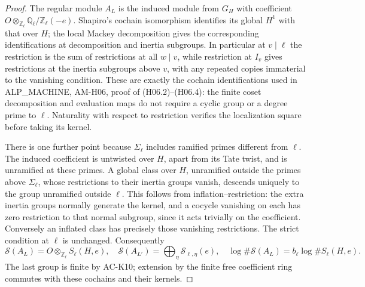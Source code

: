 \begin{proof}
The regular module $A_L$ is the induced module from
$G_H$ with coefficient
$O\otimes_{\mathbb Z_\ell}\mathbb Q_\ell/\mathbb Z_\ell(-e)$.
Shapiro's cochain isomorphism identifies its global
$H^1$ with that over $H$; the local Mackey decomposition
gives the corresponding identifications at decomposition
and inertia subgroups.  In particular at $v\mid\ell$
the restriction is the sum of restrictions at all
$w\mid v$, while restriction at $I_v$ gives restrictions
at the inertia subgroups above $v$, with any repeated
copies immaterial to the vanishing condition.
These are exactly the cochain identifications used in
ALP\_MACHINE, AM-H06, proof of (H06.2)--(H06.4):
the finite coset decomposition and evaluation maps do
not require a cyclic group or a degree prime to $\ell$.
Naturality with respect to restriction verifies the
localization square before taking its kernel.

There is one further point because $\Sigma_\ell$ includes
ramified primes different from $\ell$.  The induced
coefficient is untwisted over $H$, apart from its Tate
twist, and is unramified at these primes.  A global
class over $H$, unramified outside the primes above
$\Sigma_\ell$, whose restrictions to their inertia
groups vanish, descends uniquely to the group unramified
outside $\ell$.  This follows from inflation--restriction:
the extra inertia groups normally generate the kernel,
and a cocycle vanishing on each has zero restriction
to that normal subgroup, since it acts trivially on
the coefficient.  Conversely an inflated class
has precisely those vanishing restrictions.
The strict condition at $\ell$ is unchanged.
Consequently
\[
 \mathcal S(A_L)=O\otimes_{\mathbb Z_\ell}S_\ell(H,e),
 \quad
 \mathcal S(A_{L'})=\bigoplus_\eta\mathcal S_{\ell,\eta}(e),
 \quad
 \log\#\mathcal S(A_L)=b_\ell\log\#S_\ell(H,e).    \tag{FC.11}
\]
The last group is finite by AC-K10; extension by the
finite free coefficient ring commutes with these
cochains and their kernels.


\end{proof}
